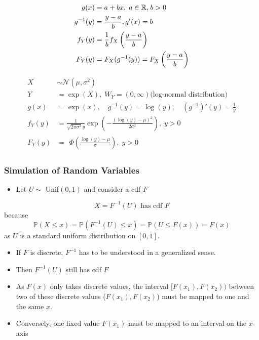 \begin{align*}
    g(x)      & =a+bx,\;a\in\mathbb{R}\text,\;b>0           \\
    g^{-1}(y) & =\frac{y-a}b, g'(x)=b                       \\
    f_Y(y)    & =\frac1bf_X\left(\frac{y-a}b\right)         \\
    F_Y(y)    & =F_X(g^{-1}(y))=F_X\left(\frac{y-a}b\right)
\end{align*}

\begin{align*}
    X      & \sim\mathcal{N}(\mu,\sigma^2)                                                              \\
    Y      & =\exp(X),\;W_Y=(0,\infty) \text{(log-normal distribution)}                                 \\
    g(x)   & =\exp(x),\quad g^{-1}(y)=\log(y),\quad(g^{-1})'(y)=\frac{1}{y}                             \\
    f_Y(y) & =\frac{1}{\sqrt{2\pi\sigma^2}y}\exp\left(-\frac{{(\log(y)-\mu)}^2}{2\sigma^2}\right),\;y>0 \\
    F_Y(y) & =\begin{aligned}\Phi\left(\frac{\log(y)-\mu}\sigma\right),\;y>0\end{aligned}
\end{align*}

\subsubsection{Simulation of Random Variables}

\begin{itemize}
    \item Let $U\sim$ Unif$(0,1)$ and consider a cdf $F$
\end{itemize}
\begin{equation*}
    X=F^{-1}(U) \text{ has cdf }F
\end{equation*}
because
\begin{equation*}
    \mathbb{P}(X\leq x)=\mathbb{P}(F^{-1}(U)\leq x)=\mathbb{P}(U\leq F(x))=F(x)
\end{equation*}
as $U$ is a standard uniform distribution on $[0,1]$.


\begin{itemize}
    \item If $F$ is discrete, $F^{-1}$ has to be understood in a generalized sense.
    \item Then $F^{-1}(U)$ still has cdf $F$
    \item As $F(x)$ only takes discrete values, the interval $[F(x_1), F(x_2))$ between two of these discrete values ($F(x_1), F(x_2)$) must be mapped to one and the same $x$. %
    \item Conversely, one fixed value $F(x_1)$ must be mapped to an interval on the $x$-axis
\end{itemize}

